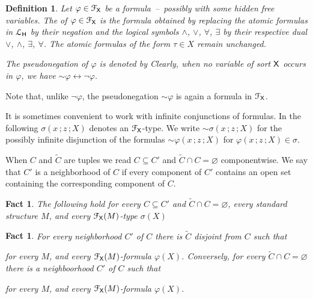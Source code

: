 \documentclass{amsproc}
\newcounter{thm}
\theoremstyle{mio}
\newtheorem{fact}[thm]{Fact}\tcolorboxenvironment{fact}{mythm}
\newtheorem{definition}[thm]{Definition}\tcolorboxenvironment{definition}{mythm}
\renewcommand*{\emph}[1]{%
   \smash{\tikz[baseline]\node[rectangle, fill=teal!25, rounded corners, inner xsep=0.5ex, inner ysep=0.2ex, anchor=base, minimum height = 2.7ex]{\strut #1};}}
\begin{document}
\begin{definition}
  Let $\varphi\in{\EuScript F}_{\sf X}$ be a formula~--~possibly with some hidden free variables.
  The \emph{pseudonegation\/} of $\varphi\in{\EuScript F}_{\sf X}$ is the formula obtained by replacing the atomic formulas in  ${\EuScript L}_{\sf H}$ by their negation and the logical symbols $\wedge$, $\vee$, $\forall$, $\exists$
  by their respective dual $\vee$, $\wedge$, $\exists$, $\forall$.
  The atomic formulas of the form $\tau\in X$ remain unchanged.\smallskip
  
The pseudonegation of $\varphi$ is denoted by \emph{${\sim}\varphi$.}
Clearly, when no variable of sort ${\sf X}$ occurs in $\varphi$, we have ${\sim}\varphi\leftrightarrow\neg\varphi$.
\end{definition}

Note that, unlike $\neg\varphi$, the pseudonegation ${\sim}\varphi$ is again a formula in ${\EuScript F}_{\sf X}$.

It is sometimes convenient to work with infinite conjunctions of formulas.
In the following $\sigma(x\,;z\,;X)$ denotes an ${\EuScript F}_{\sf X}$-type.
We write ${\sim}\sigma(x\,;z\,;X)$ for the possibly infinite disjunction of the formulas ${\sim}\varphi(x\,;z\,;X)$ for $\varphi(x\,;z\,;X)\in\sigma$.

When $C$ and $\tilde C$ are tuples we read $C\subseteq C'$ and $\tilde C\cap C=\varnothing$ componentwise.
We say that $C'$ is a neighborhood of $C$ if every component of $C'$ contains an open set containing the corresponding component of $C$.

\begin{fact}\label{fact_trivial}
  The following hold for every $C\subseteq C'$ and $\tilde C\cap C=\varnothing$, every standard structure $M$, and every ${\EuScript F}_{\sf X}(M)$-type $\sigma(X)$\smallskip

  \smallskip

  \smallskip
  
\end{fact}

\begin{fact}
  For every neighborhood $C'$ of $C$ there is $\tilde C$ disjoint from $C$ such that\smallskip
  
  \smallskip

  for every $M$, and every ${\EuScript F}_{\sf X}(M)$-formula $\varphi(X)$.
  Conversely, for every $\tilde C\cap C=\varnothing$ there is a neighboorhood $C'$ of $C$ such that

  \smallskip

  for every $M$, and every ${\EuScript F}_{\sf X}(M)$-formula $\varphi(X)$.
\end{fact}
\end{document}
